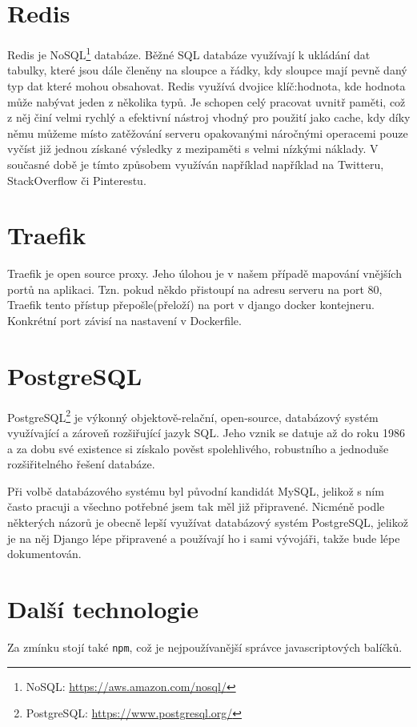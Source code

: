 \section{Redis}
Redis je NoSQL\footnote{NoSQL: \url{https://aws.amazon.com/nosql/}} databáze. Běžné SQL databáze využívají k ukládání dat tabulky, které jsou dále členěny na sloupce a řádky, kdy sloupce mají pevně daný typ dat které mohou obsahovat. Redis využívá dvojice klíč:hodnota, kde hodnota může nabývat jeden z několika typů. Je schopen celý pracovat uvnitř paměti, což z něj činí velmi rychlý a efektivní nástroj vhodný pro použití jako cache, kdy díky němu můžeme místo zatěžování serveru opakovanými náročnými operacemi pouze vyčíst již jednou získané výsledky z mezipaměti s velmi nízkými náklady. V současné době je tímto způsobem využíván například například na Twitteru, StackOverflow či Pinterestu.

\section{Traefik}
Traefik je open source proxy. Jeho úlohou je v našem případě mapování vnějších portů na aplikaci. Tzn. pokud někdo přistoupí na adresu serveru na port 80, Traefik tento přístup přepošle(přeloží) na port v django docker kontejneru. Konkrétní port závisí na nastavení v Dockerfile.


\section{PostgreSQL}
PostgreSQL\footnote{PostgreSQL: \url{https://www.postgresql.org/}} je výkonný objektově-relační, open-source, databázový systém využívající a zároveň rozšiřující jazyk SQL. Jeho vznik se datuje až do roku 1986 a za dobu své existence si získalo pověst spolehlivého, robustního a jednoduše rozšiřitelného řešení databáze. \cite{PostgreSQL}
\par Při volbě databázového systému byl původní kandidát MySQL, jelikož s ním často pracuji a všechno potřebné jsem tak měl již připravené. Nicméně podle některých názorů \cite{WHY-POSTGRES1}\cite{WHY-POSTGRES2} je obecně lepší využívat databázový systém PostgreSQL, jelikož je na něj Django lépe připravené a používají ho i sami vývojáři, takže bude lépe dokumentován.

\section{Další technologie}
Za zmínku stojí také \texttt{npm}, což je nejpoužívanější správce javascriptových balíčků. 



